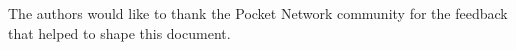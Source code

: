\documentclass[conference,compsoc]{IEEEtran}
\begin{document}
The authors would like to thank the Pocket Network community for the feedback that helped to shape this document.









%






\end{document}
